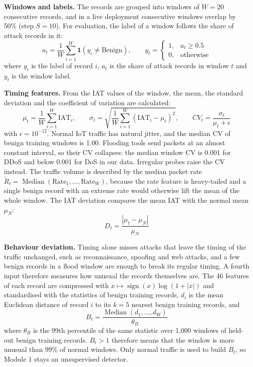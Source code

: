 \documentclass[]{interact}
\theoremstyle{plain}
\theoremstyle{definition}
\begin{document}
\textbf{Windows and labels.} The records are grouped into windows of $W = 20$ consecutive records, and in a live deployment consecutive windows overlap by 50\% (step $S = 10$). For evaluation, the label of a window follows the share of attack records in it:
\begin{equation}
  a_t = \frac{1}{W}\sum_{i=1}^{W} \mathbf{1}\!\left(y_i \neq \text{Benign}\right),
  \qquad
  y_t = \begin{cases} 1, & a_t \ge 0.5\\ 0, & \text{otherwise} \end{cases}
\end{equation}
where $y_i$ is the label of record $i$, $a_t$ is the share of attack records in window $t$ and $y_t$ is the window label.

\textbf{Timing features.} From the IAT values of the window, the mean, the standard deviation and the coefficient of variation are calculated:
\begin{equation}
  \mu_t = \frac{1}{W}\sum_{i=1}^{W}\mathrm{IAT}_i,\qquad
  \sigma_t = \sqrt{\frac{1}{W}\sum_{i=1}^{W}\left(\mathrm{IAT}_i-\mu_t\right)^2},\qquad
  CV_t = \frac{\sigma_t}{\mu_t + \epsilon}
\end{equation}
with $\epsilon = 10^{-12}$. Normal IoT traffic has natural jitter, and the median CV of benign training windows is 1.00. Flooding tools send packets at an almost constant interval, so their CV collapses: the median window CV is 0.001 for DDoS and below 0.001 for DoS in our data. Irregular probes raise the CV instead. The traffic volume is described by the median packet rate $\tilde{R}_t = \operatorname{Median}(\mathrm{Rate}_1,\ldots,\mathrm{Rate}_W)$, because the rate feature is heavy-tailed and a single benign record with an extreme rate would otherwise lift the mean of the whole window. The IAT deviation compares the mean IAT with the normal mean $\mu_N$:
\begin{equation}
  D_t = \frac{\left|\mu_t-\mu_{N}\right|}{\mu_{N}}
\end{equation}

\textbf{Behaviour deviation.} Timing alone misses attacks that leave the timing of the traffic unchanged, such as reconnaissance, spoofing and web attacks, and a few benign records in a flood window are enough to break its regular timing. A fourth input therefore measures how unusual the records themselves are. The 46 features of each record are compressed with $x \mapsto \operatorname{sign}(x)\log(1+|x|)$ and standardised with the statistics of benign training records, $d_i$ is the mean Euclidean distance of record $i$ to its $k = 5$ nearest benign training records, and
\begin{equation}
  B_t = \frac{\operatorname{Median}\left(d_1, \ldots, d_W\right)}{\theta_B}
\end{equation}
where $\theta_B$ is the 99th percentile of the same statistic over 1,000 windows of held-out benign training records. $B_t > 1$ therefore means that the window is more unusual than 99\% of normal windows. Only normal traffic is used to build $B_t$, so Module 1 stays an unsupervised detector.
\end{document}
